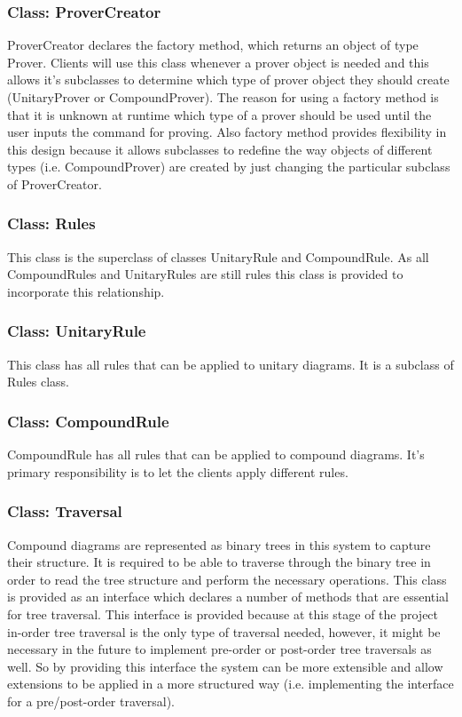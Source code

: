 \documentclass[10pt, a4paper, titlepage]{article}
\begin{document}
\subsubsection{Class: ProverCreator}
ProverCreator declares the factory method, which returns an object of type Prover. Clients will use this class whenever a prover object is needed and this allows it's subclasses to determine which type of prover object they should create (UnitaryProver or CompoundProver). The reason for using a factory method is that it is unknown at runtime which type of a prover should be used until the user inputs the command for proving. Also factory method provides flexibility in this design because it allows subclasses to redefine the way objects of different types (i.e. CompoundProver) are created by just changing the particular subclass of ProverCreator. 

\subsubsection{Class: Rules}
This class is the superclass of classes UnitaryRule and CompoundRule. As all CompoundRules and UnitaryRules are still rules this class is provided to incorporate this relationship.
 
\subsubsection{Class: UnitaryRule}
This class has all rules that can be applied to unitary diagrams. It is a subclass of Rules class.

\subsubsection{Class: CompoundRule}
CompoundRule has all rules that can be applied to compound diagrams. It's primary responsibility is to let the clients apply different rules.

\subsubsection{Class: Traversal}
Compound diagrams are represented as binary trees in this system to capture their structure. It is required to be able to traverse through the binary tree in order to read the tree structure and perform the necessary operations. This class is provided as an interface which declares a number of methods that are essential for tree traversal. This interface is provided because at this stage of the project in-order tree traversal is the only type of traversal needed, however, it might be necessary in the future to implement pre-order or post-order tree traversals as well. So by providing this interface the system can be more extensible and allow extensions to be applied in a more structured way (i.e. implementing the interface for a pre/post-order traversal).\\
\end{document}
